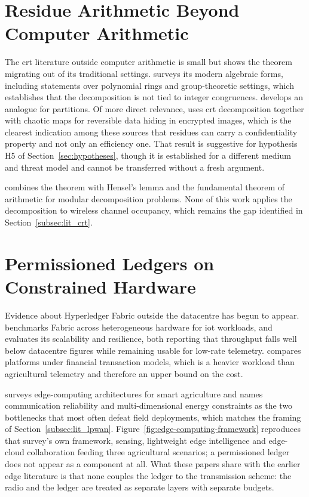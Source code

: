 \documentclass[12pt,a4paper,oneside]{book}
\begin{document}
\section{Residue Arithmetic Beyond Computer Arithmetic}
\label{subsec:lit_crt_extended}

The \gls{crt} literature outside computer arithmetic is small but shows the
theorem migrating out of its traditional settings.
\textcite{luo2023researchapplication} surveys its modern algebraic forms,
including statements over polynomial rings and group-theoretic settings, which
establishes that the decomposition is not tied to integer congruences.
\textcite{seethalakshmi2023chineseremainder} develops an analogue for
partitions. Of more direct relevance,
\textcite{yavuz2025reversibledata} uses \gls{crt} decomposition together with
chaotic maps for reversible data hiding in encrypted images, which is the
clearest indication among these sources that residues can carry a
confidentiality property and not only an efficiency one. That result is
suggestive for
hypothesis H5 of Section~\ref{sec:hypotheses}, though it is established for a
different medium and threat model and cannot be transferred without a fresh
argument.

\textcite{oktaviansyah2025hybridizinghensel} combines the theorem with Hensel's
lemma and the fundamental theorem of arithmetic for modular decomposition
problems. None of this work applies the decomposition to wireless channel
occupancy, which remains the gap identified in Section~\ref{subsec:lit_crt}.

\section{Permissioned Ledgers on Constrained Hardware}
\label{subsec:lit_edge_extended}

Evidence about Hyperledger Fabric outside the datacentre has begun to appear.
\textcite{zulkarnain2025performancebenchmarking} benchmarks Fabric across
heterogeneous hardware for \gls{iot} workloads, and
\textcite{pebriyanti2025evaluationscalability} evaluates its scalability and
resilience, both reporting that throughput falls well below datacentre figures
while remaining usable for low-rate telemetry.
\textcite{kwadzode2025performancecomparison} compares platforms under financial
transaction models, which is a heavier workload than agricultural telemetry and
therefore an upper bound on the cost.

\textcite{gong2025edge} surveys edge-computing architectures for smart
agriculture and names communication reliability and multi-dimensional energy
constraints as the two bottlenecks that most often defeat field deployments,
which matches the framing of Section~\ref{subsec:lit_lpwan}. Figure~\ref{fig:edge-computing-framework}
reproduces that survey's own framework, sensing, lightweight edge
intelligence and edge-cloud collaboration feeding three agricultural
scenarios; a permissioned ledger does not appear as a component at all. What
these papers share with the earlier edge literature is that none couples the
ledger to the transmission scheme: the radio and the ledger are treated as
separate layers with separate budgets.
\end{document}
